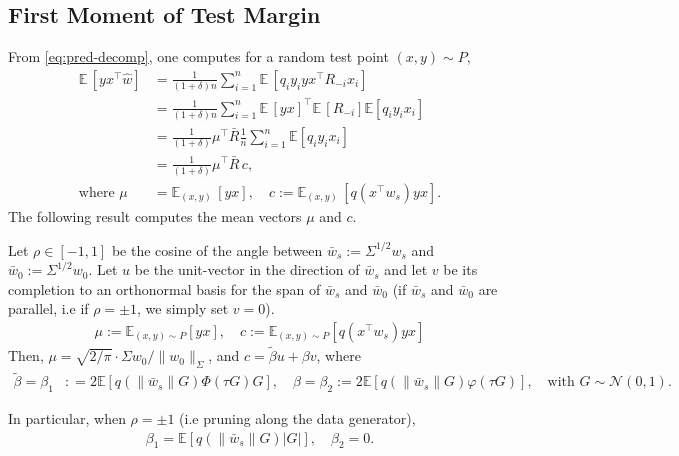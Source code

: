 \subsection{First Moment of Test Margin}
From \eqref{eq:pred-decomp}, one computes for a random test point $(x,y) \sim P$,
\begin{align*}
\mathbb E\,[yx^\top \hat w] &= \frac{1}{(1+\delta)n}\sum_{i=1}^n \mathbb E\,[q_i y_i yx^\top R_{-i} x_i]\\
&= \frac{1}{(1+\delta)n}\sum_{i=1}^n \mathbb E\,[yx]^\top \mathbb E\,[R_{-i}]\mathbb E[q_i y_i x_i]\\
&= \frac{1}{(1+\delta)}\mu^\top\bar R\frac{1}{n}\sum_{i=1}^n \mathbb E[q_i y_ix_i]\\
&= \frac{1}{(1+\delta)}\mu^\top\bar R\,c,\\
\text{where }\mu &= \mathbb E_{(x,y)}\,[yx],\quad  c := \mathbb E_{(x,y)}\,[q(x^\top w_s) y x].
\end{align*}
The following result computes the mean vectors $\mu$ and $c$.
\begin{lemma}
Let $\rho \in [-1,1]$ be the cosine of the angle between $\bar w_s:=\Sigma^{1/2}w_s$ and $\bar w_0:=\Sigma^{1/2}w_0$. Let $u$ be the unit-vector in the direction of $\bar w_s$  and let $v$ be its completion to an orthonormal basis for the span of $\bar w_s$ and $\bar w_0$ (if $\bar w_s$ and $\bar w_0$ are parallel, i.e if $\rho=\pm 1$, we simply set $v=0$).
\begin{eqnarray}
 \mu  :=  \mathbb E_{(x,y) \sim P}[yx],\quad c :=  \mathbb E_{(x,y) \sim P}[q(x^\top w_s)y x]
\end{eqnarray}
Then, $\mu=\sqrt{2/\pi}\cdot \Sigma w_0/\|w_0\|_\Sigma$, and $c = \tilde \beta u + \beta v$, where
\begin{align}
    \tilde \beta = \beta_1 &: = 2\mathbb E\left[q(\|\bar w_s\|G)\Phi\left(\tau G\right)G\right],\quad \beta = \beta_2 := 2\mathbb E\left[q(\|\bar w_s\|G)\varphi(\tau G)\right],\quad \text{with }G\sim \mathcal N(0,1).
\end{align}

In particular, when $\rho = \pm 1$ (i.e pruning along the data generator), 
\begin{align}
    \beta_1 = \mathbb E[q(\|\bar w_s\|G)|G|],\quad \beta_2=0. 
\end{align}

\label{lm:means}
\end{lemma}

